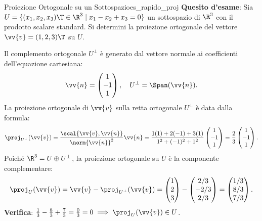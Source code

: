 \begin{esempio}{Proiezione Ortogonale su un Sottospazio}{es_rapido_proj}
\textbf{Quesito d'esame}: Sia $U = \{ (x_1, x_2, x_3)\T \in \R^3 \mid x_1 - x_2 + x_3 = 0 \}$ un sottospazio di $\R^3$ con il prodotto scalare standard. Si determini la proiezione ortogonale del vettore $\vv{v} = (1, 2, 3)\T$ su $U$.

\begin{dimostrazione}[Risoluzione]
Il complemento ortogonale $U^\perp$ è generato dal vettore normale ai coefficienti dell'equazione cartesiana:
\begin{equation}
    \vv{n} = \begin{pmatrix} 1 \\ -1 \\ 1 \end{pmatrix}, \quad U^\perp = \Span(\vv{n}).
\end{equation}
La proiezione ortogonale di $\vv{v}$ sulla retta ortogonale $U^\perp$ è data dalla formula:
\begin{equation}
    \proj_{U^\perp}(\vv{v}) = \frac{\scal{\vv{v}, \vv{n}}}{\norm{\vv{n}}^2} \vv{n} = \frac{1(1) + 2(-1) + 3(1)}{1^2 + (-1)^2 + 1^2} \begin{pmatrix} 1 \\ -1 \\ 1 \end{pmatrix} = \frac{2}{3} \begin{pmatrix} 1 \\ -1 \\ 1 \end{pmatrix}.
\end{equation}
Poiché $\R^3 = U \oplus U^\perp$, la proiezione ortogonale su $U$ è la componente complementare:
\begin{equation}
    \proj_U(\vv{v}) = \vv{v} - \proj_{U^\perp}(\vv{v}) = \begin{pmatrix} 1 \\ 2 \\ 3 \end{pmatrix} - \begin{pmatrix} 2/3 \\ -2/3 \\ 2/3 \end{pmatrix} = \begin{pmatrix} 1/3 \\ 8/3 \\ 7/3 \end{pmatrix}.
\end{equation}
\textbf{Verifica}: $\frac{1}{3} - \frac{8}{3} + \frac{7}{3} = \frac{0}{3} = 0 \implies \proj_U(\vv{v}) \in U$.
\end{dimostrazione}
\end{esempio}

